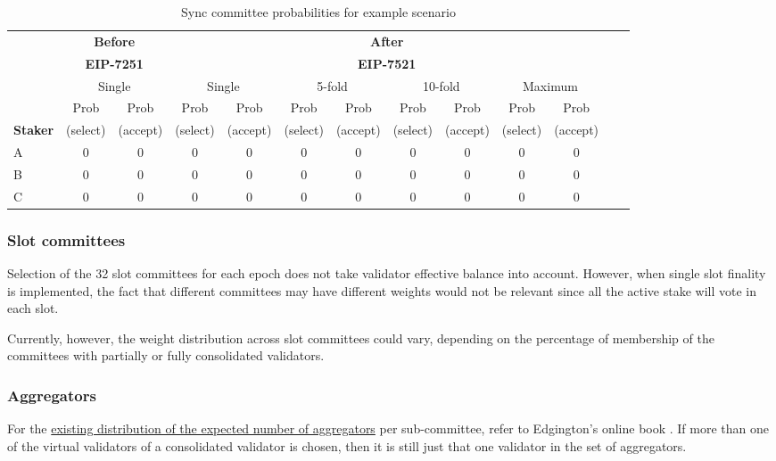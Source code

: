 \begin{table}[htp]
\caption{Sync committee probabilities for example scenario }
\begin{center}
\setlength\tabcolsep{2pt}                %
\begin{tabular}{|l|c|c|c|c|c|c|c|c|c|c|c|c|}
\hline
& \multicolumn{2}{c|}{\textbf{Before }} & \multicolumn{8}{c|}{\textbf{After}} \\
& \multicolumn{2}{c|}{\textbf{EIP-7251}} & \multicolumn{8}{c|}{\textbf{EIP-7521}} \\
\cline{2-3} \cline{4-11} 
& \multicolumn{2}{c|}{Single} &  \multicolumn{2}{c|}{Single} & \multicolumn{2}{c|}{5-fold} &  \multicolumn{2}{c|}{10-fold} &  \multicolumn{2}{c|}{Maximum} \\
\cline{2-3} \cline{4-5} \cline{6-7} \cline{8-9} \cline{10-11}
 & Prob &  Prob  & Prob &  Prob  & Prob &  Prob & Prob &  Prob  & Prob &  Prob  \\
\textbf{Staker}  & (select) &  (accept)  & (select) &  (accept)  & (select) &  (accept) & (select) &  (accept)  & (select) &  (accept)  \\
\hline
A & 0 & 0 & 0 &0 & 0 & 0 & 0 & 0 & 0 & 0  \\
B & 0 & 0 & 0 &0 & 0 & 0 & 0 & 0 & 0 & 0  \\
C & 0 & 0 & 0 &0 & 0 & 0 & 0 & 0 & 0 & 0  \\
\hline
\end{tabular}
\end{center}
\label{tbl:syncprobs}
\end{table}%


\subsubsection*{Slot committees}
Selection of the 32 slot committees for each epoch does not take validator effective balance into account. However, when single slot finality is implemented, the fact that different committees may have different weights would not be relevant since all the active stake will vote in each slot.

Currently, however, the weight distribution across slot committees could vary, depending on the percentage of membership of the committees with partially or fully consolidated validators.
\subsubsection*{Aggregators}
For the \href{https://eth2book.info/capella/part2/building_blocks/aggregator/}{existing distribution of the expected number of aggregators} per sub-committee, refer to Edgington's online book \cite{Edgington2023}.
If more than one of the virtual validators of a consolidated validator is chosen, then it is still just that one validator in the set of aggregators. 
